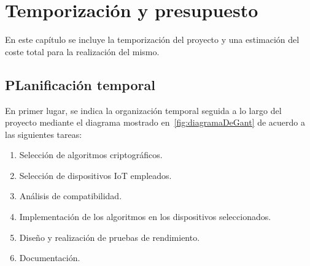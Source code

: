 %
%
%
% 
%
%
%
%

\chapter{Temporización y presupuesto}\label{cha:temp_pres}

En este capítulo se incluye la temporización del proyecto y una estimación del coste total para la realización del mismo.


\section{PLanificación temporal}\label{sec:plan_temp}

En primer lugar, se indica la organización temporal seguida a lo largo del proyecto mediante el diagrama mostrado en~\ref{fig:diagramaDeGant} de acuerdo a las siguientes tareas:

\begin{enumerate}
    \item Selección de algoritmos criptográficos.
    \item Selección de dispositivos \ac{IoT} empleados.
    \item Análisis de compatibilidad.
    \item Implementación de los algoritmos en los dispositivos seleccionados.
    \item Diseño y realización de pruebas de rendimiento.
    \item Documentación.
\end{enumerate}
    

